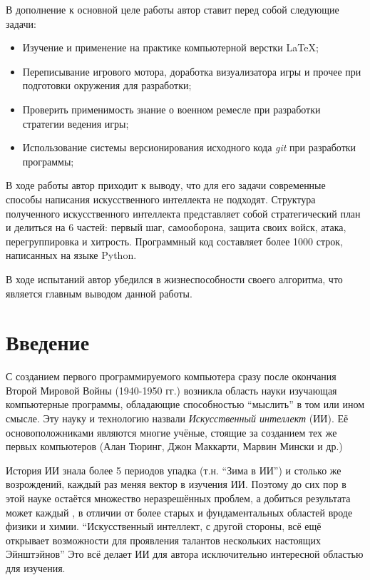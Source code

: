 \documentclass[12pt]{report}
\newenvironment{myItemize}{
	\begin{itemize}
  		\setlength{\itemsep}{1pt}
  		\setlength{\parskip}{0pt}
  		\setlength{\parsep}{0pt}
}{\end{itemize}}
\begin{document}
В дополнение к основной целе работы автор ставит перед собой следующие задачи:
\begin{myItemize}
\item Изучение и применение на практике компьютерной верстки \LaTeX;
\item Переписывание игрового мотора, доработка визуализатора игры и прочее при подготовки окружения для разработки;
\item Проверить применимость знание о военном ремесле при разработки стратегии ведения игры;
\item Использование системы версионирования исходного кода \emph{git} при разработки программы; 
\end{myItemize}

В ходе работы автор приходит к выводу, что для его задачи современные способы написания искусственного интеллекта не подходят. Структура полученного искусственного интеллекта представляет собой стратегический план и делиться на 6 частей: первый шаг, самооборона, защита своих войск, атака, перегруппировка и хитрость. Программный код составляет более 1000 строк, написанных на языке Python.

В ходе испытаний автор убедился в жизнеспособности своего алгоритма, что является главным выводом данной работы.


\chapter*{Введение}
\thispagestyle{fancy}

С созданием первого программируемого компьютера сразу после окончания Второй Мировой Войны (1940-1950 гг.) возникла область науки изучающая компьютерные программы, обладающие способностью ``мыслить'' в том или ином смысле. Эту науку и технологию назвали \emph{Искусственный интеллект} (ИИ). Её основоположниками являются многие учёные, стоящие за созданием тех же первых компьютеров (Алан Тюринг, Джон Маккарти, Марвин Мински и др.)

История ИИ знала более 5 периодов упадка (т.н. ``Зима в ИИ'') и столько же возрождений, каждый раз меняя вектор в изучения ИИ. Поэтому до сих пор в этой науке остаётся множество неразрешённых проблем, а добиться результата может каждый \citep{russell1995}, в отличии от более старых и фундаментальных областей вроде физики и химии. ``Искусственный интеллект, с другой стороны, всё ещё открывает возможности для проявления талантов нескольких настоящих Эйнштэйнов'' \citep{russell1995} Это всё делает ИИ для автора исключительно интересной областью для изучения.
\end{document}
